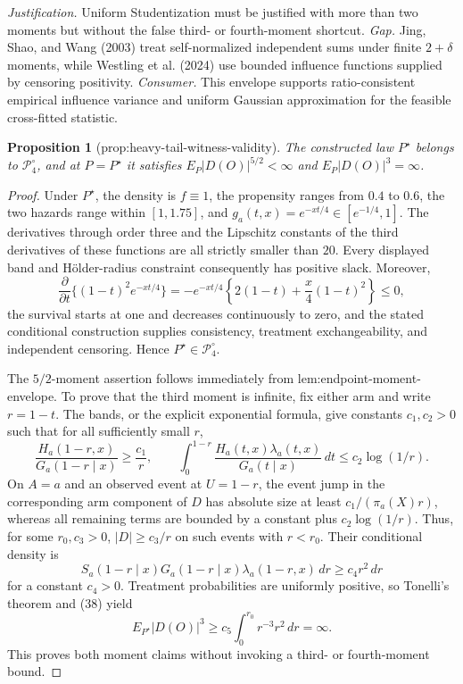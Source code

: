 \documentclass{article}
\newtheorem{proposition}{Proposition}
\begin{document}
\par\smallskip\noindent \textit{Justification.} Uniform Studentization must be justified with more than two moments but without the false third- or fourth-moment shortcut. \textit{Gap.} Jing, Shao, and Wang (2003) treat self-normalized independent sums under finite \(2+\delta\) moments, while Westling et al. (2024) use bounded influence functions supplied by censoring positivity. \textit{Consumer.} This envelope supports ratio-consistent empirical influence variance and uniform Gaussian approximation for the feasible cross-fitted statistic.

\begin{proposition}[prop:heavy-tail-witness-validity]\label{prop:heavy-tail-witness-validity}
The constructed law \(P^{\star}\) belongs to \(\mathcal P_4^{\circ}\), and at \(P=P^{\star}\) it satisfies \(E_P|D(O)|^{5/2}<\infty\) and \(E_P|D(O)|^3=\infty\).
\end{proposition}
\begin{proof}
Under \(P^{\star}\), the density is \(f\equiv1\), the propensity ranges from \(0.4\) to \(0.6\), the two hazards range within \([1,1.75]\), and
\(g_a(t,x)=e^{-xt/4}\in[e^{-1/4},1]\).  The derivatives through order three and the Lipschitz constants of the third derivatives of these functions are all strictly smaller than \(20\).  Every displayed band and Hölder-radius constraint consequently has positive slack.  Moreover,
\[
 \frac{\partial}{\partial t}\{(1-t)^2e^{-xt/4}\}
 =-e^{-xt/4}\left\{2(1-t)+\frac{x}{4}(1-t)^2\right\}\le0,
\]
the survival starts at one and decreases continuously to zero, and the stated conditional construction supplies consistency, treatment exchangeability, and independent censoring.  Hence \(P^{\star}\in\mathcal P_4^{\circ}\).

The \(5/2\)-moment assertion follows immediately from lem:endpoint-moment-envelope.  To prove that the third moment is infinite, fix either arm and write \(r=1-t\).  The bands, or the explicit exponential formula, give constants \(c_1,c_2>0\) such that for all sufficiently small \(r\),
\[
 \frac{H_a(1-r,x)}{G_a(1-r\mid x)}\ge\frac{c_1}{r},
 \qquad
 \int_0^{1-r}\frac{H_a(t,x)\lambda_a(t,x)}{G_a(t\mid x)}\,dt
 \le c_2\log(1/r). \tag{38}
\]
On \(A=a\) and an observed event at \(U=1-r\), the event jump in the corresponding arm component of \(D\) has absolute size at least \(c_1/(\pi_a(X)r)\), whereas all remaining terms are bounded by a constant plus \(c_2\log(1/r)\).  Thus, for some \(r_0,c_3>0\), \(|D|\ge c_3/r\) on such events with \(r<r_0\).  Their conditional density is
\[
 S_a(1-r\mid x)G_a(1-r\mid x)\lambda_a(1-r,x)\,dr\ge c_4r^2\,dr
\]
for a constant \(c_4>0\).  Treatment probabilities are uniformly positive, so Tonelli's theorem and (38) yield
\[
 E_{P^{\star}}|D(O)|^3
 \ge c_5\int_0^{r_0}r^{-3}r^2\,dr
 =\infty.
\]
This proves both moment claims without invoking a third- or fourth-moment bound.
\end{proof}
\end{document}
